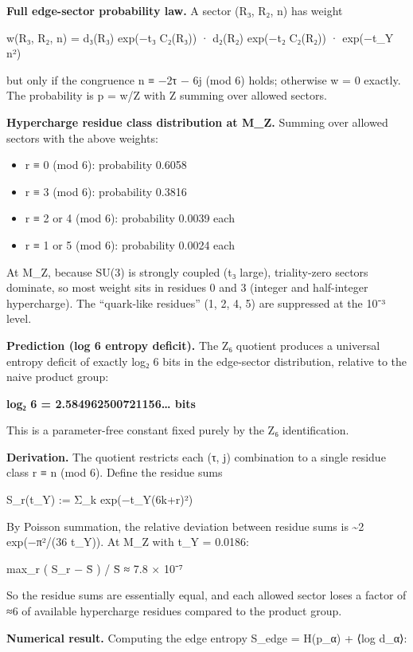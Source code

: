 \documentclass[11pt,a4paper]{article}
\theoremstyle{remark}
\providecommand{\tightlist}{%
  \setlength{\itemsep}{0pt}\setlength{\parskip}{0pt}}
\begin{document}
\textbf{Full edge-sector probability law.} A sector (R₃, R₂, n) has weight

w(R₃, R₂, n) = d₃(R₃) exp(−t₃ C₂(R₃)) · d₂(R₂) exp(−t₂ C₂(R₂)) · exp(−t\_Y n²)

but only if the congruence n ≡ −2τ − 6j (mod 6) holds; otherwise w = 0 exactly. The probability is p = w/Z with Z summing over allowed sectors.

\textbf{Hypercharge residue class distribution at M\_Z.} Summing over allowed
sectors with the above weights:

\begin{itemize}
\tightlist
\item
  r ≡ 0 (mod 6): probability 0.6058
\item
  r ≡ 3 (mod 6): probability 0.3816
\item
  r ≡ 2 or 4 (mod 6): probability 0.0039 each
\item
  r ≡ 1 or 5 (mod 6): probability 0.0024 each
\end{itemize}

At M\_Z, because SU(3) is strongly coupled (t₃ large), triality-zero
sectors dominate, so most weight sits in residues 0 and 3 (integer and
half-integer hypercharge). The ``quark-like residues'' (1, 2, 4, 5) are
suppressed at the 10⁻³ level.

\textbf{Prediction (log 6 entropy deficit).} The Z₆ quotient produces a universal entropy deficit of exactly log₂ 6 bits in the edge-sector distribution, relative to the naive product group:

\textbf{log₂ 6 = 2.584962500721156\ldots{} bits}

This is a parameter-free constant fixed purely by the Z₆ identification.

\textbf{Derivation.} The quotient restricts each (τ, j) combination to a single residue class r ≡ n (mod 6). Define the residue sums

S\_r(t\_Y) := Σ\_k exp(−t\_Y(6k+r)²)

By Poisson summation, the relative deviation between residue sums is \textasciitilde2 exp(−π²/(36 t\_Y)). At M\_Z with t\_Y = 0.0186:

max\_r \textbar( S\_r − S̄ ) / S̄\textbar{} ≈ 7.8 × 10⁻⁷

So the residue sums are essentially equal, and each allowed sector loses a factor of ≈6 of available hypercharge residues compared to the product group.

\textbf{Numerical result.} Computing the edge entropy S\_edge = H(p\_α) + ⟨log d\_α⟩:
\end{document}
